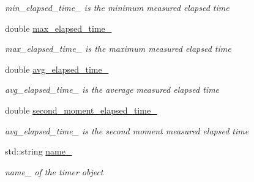 \begin{DoxyCompactItemize}
\begin{DoxyCompactList}\small\item\em min\+\_\+elapsed\+\_\+time\+\_\+ is the minimum measured elapsed time \end{DoxyCompactList}\item 
double \hyperlink{classreal__time__tools_1_1Timer_a6d794ee63c2eafb0399d55b433c27c43}{max\+\_\+elapsed\+\_\+time\+\_\+}\hypertarget{classreal__time__tools_1_1Timer_a6d794ee63c2eafb0399d55b433c27c43}{}\label{classreal__time__tools_1_1Timer_a6d794ee63c2eafb0399d55b433c27c43}

\begin{DoxyCompactList}\small\item\em max\+\_\+elapsed\+\_\+time\+\_\+ is the maximum measured elapsed time \end{DoxyCompactList}\item 
double \hyperlink{classreal__time__tools_1_1Timer_a058a28efa6f0fd3c4e332068e7db8574}{avg\+\_\+elapsed\+\_\+time\+\_\+}\hypertarget{classreal__time__tools_1_1Timer_a058a28efa6f0fd3c4e332068e7db8574}{}\label{classreal__time__tools_1_1Timer_a058a28efa6f0fd3c4e332068e7db8574}

\begin{DoxyCompactList}\small\item\em avg\+\_\+elapsed\+\_\+time\+\_\+ is the average measured elapsed time \end{DoxyCompactList}\item 
double \hyperlink{classreal__time__tools_1_1Timer_a1d4e8ddf078ef1c544e2715a0420726a}{second\+\_\+moment\+\_\+elapsed\+\_\+time\+\_\+}\hypertarget{classreal__time__tools_1_1Timer_a1d4e8ddf078ef1c544e2715a0420726a}{}\label{classreal__time__tools_1_1Timer_a1d4e8ddf078ef1c544e2715a0420726a}

\begin{DoxyCompactList}\small\item\em avg\+\_\+elapsed\+\_\+time\+\_\+ is the second moment measured elapsed time \end{DoxyCompactList}\item 
std\+::string \hyperlink{classreal__time__tools_1_1Timer_aadcaf1f743a7d3d967b740ec04fc0607}{name\+\_\+}\hypertarget{classreal__time__tools_1_1Timer_aadcaf1f743a7d3d967b740ec04fc0607}{}\label{classreal__time__tools_1_1Timer_aadcaf1f743a7d3d967b740ec04fc0607}

\begin{DoxyCompactList}\small\item\em name\+\_\+ of the timer object \end{DoxyCompactList}\end{DoxyCompactItemize}


